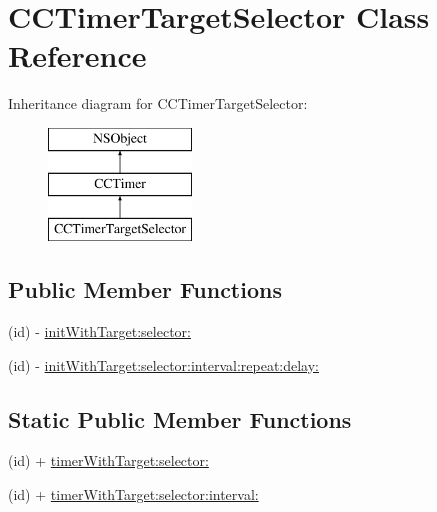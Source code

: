\hypertarget{interface_c_c_timer_target_selector}{\section{C\-C\-Timer\-Target\-Selector Class Reference}
\label{interface_c_c_timer_target_selector}
}
Inheritance diagram for C\-C\-Timer\-Target\-Selector\-:\begin{figure}[H]
\begin{center}
\leavevmode
\includegraphics[height=3.000000cm]{interface_c_c_timer_target_selector}
\end{center}
\end{figure}
\subsection*{Public Member Functions}
\begin{DoxyCompactItemize}
\item 
(id) -\/ \hyperlink{interface_c_c_timer_target_selector_a5b2032c8c650bd8cfcc245ad6078c575}{init\-With\-Target\-:selector\-:}
\item 
(id) -\/ \hyperlink{interface_c_c_timer_target_selector_aaaf078216c645685874d02c14fbd40fe}{init\-With\-Target\-:selector\-:interval\-:repeat\-:delay\-:}
\end{DoxyCompactItemize}
\subsection*{Static Public Member Functions}
\begin{DoxyCompactItemize}
\item 
(id) + \hyperlink{interface_c_c_timer_target_selector_a19fad016616e647a4433ecfacb158e8a}{timer\-With\-Target\-:selector\-:}
\item 
(id) + \hyperlink{interface_c_c_timer_target_selector_aac27cce0cf8fa6125c8f866a16a266ab}{timer\-With\-Target\-:selector\-:interval\-:}
\end{DoxyCompactItemize}
